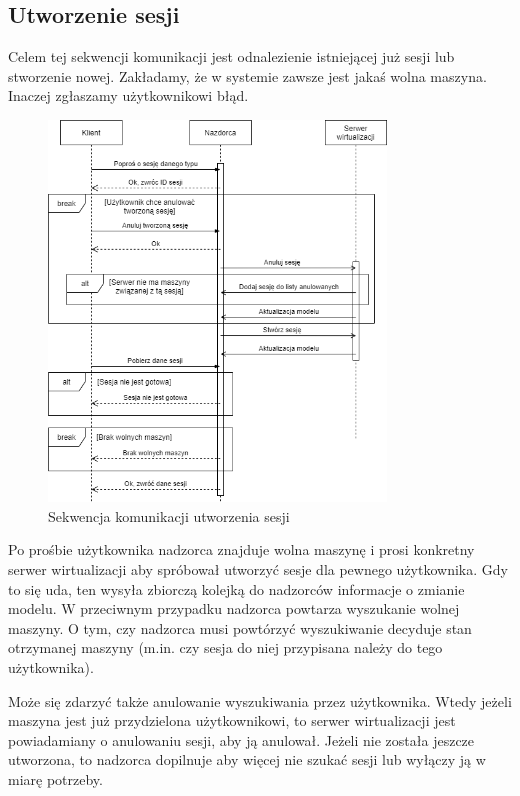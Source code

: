 \documentclass[../opis-rozwiazania.tex]{subfiles}
\begin{document}
\subsection{Utworzenie sesji}

Celem tej sekwencji komunikacji jest odnalezienie istniejącej już sesji lub stworzenie nowej.
Zakładamy, że w systemie zawsze jest jakaś wolna maszyna.
Inaczej zgłaszamy użytkownikowi błąd.

\begin{figure}[H]
    \centering
    \includegraphics[width=0.8\textwidth]{../diagrams/sequence_diagrams/tworzenie_sesji.png}
    \caption{Sekwencja komunikacji utworzenia sesji}
    \label{figure:diagrams:sequence_diagrams:tworzenie_sesji}
\end{figure}

Po prośbie użytkownika nadzorca znajduje wolna maszynę i prosi konkretny serwer wirtualizacji aby spróbował utworzyć sesje dla pewnego użytkownika.
Gdy to się uda, ten wysyła zbiorczą kolejką do nadzorców informacje o zmianie modelu.
W przeciwnym przypadku nadzorca powtarza wyszukanie wolnej maszyny.
O tym, czy nadzorca musi powtórzyć wyszukiwanie decyduje stan otrzymanej maszyny (m.in. czy sesja do niej przypisana należy do tego użytkownika).

Może się zdarzyć także anulowanie wyszukiwania przez użytkownika.
Wtedy jeżeli maszyna jest już przydzielona użytkownikowi, to serwer wirtualizacji jest powiadamiany o anulowaniu sesji, aby ją anulował.
Jeżeli nie została jeszcze utworzona, to nadzorca dopilnuje aby więcej nie szukać sesji lub wyłączy ją w miarę potrzeby.
\end{document}
